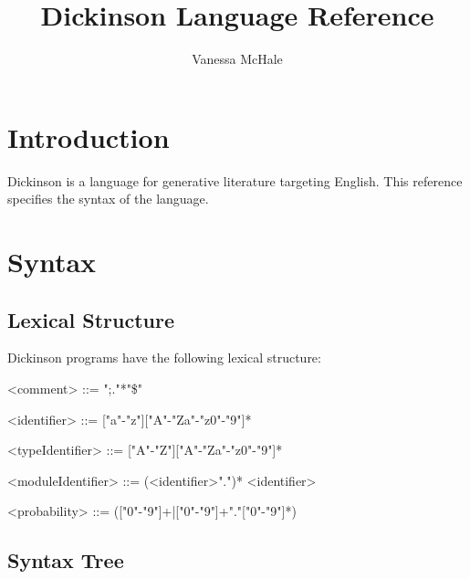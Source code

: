 \documentclass{report}
\begin{document}
\title{Dickinson Language Reference}
\author {Vanessa McHale}
\maketitle

\tableofcontents

\section{Introduction}

Dickinson is a language for generative literature targeting English. This reference specifies the syntax of the language.

\section{Syntax}

\subsection{Lexical Structure}

Dickinson programs have the following lexical structure:

\begin{grammar}

    <comment> ::= ";."*"\$"

    <identifier> ::= ["a"-"z"]["A"-"Za"-"z0"-"9"]*

    <typeIdentifier> ::= ["A"-"Z"]["A"-"Za"-"z0"-"9"]*

    <moduleIdentifier> ::= (<identifier>".")* <identifier>

    <probability> ::= (["0"-"9"]+|["0"-"9"]+"."["0"-"9"]*)

\end{grammar}

\subsection{Syntax Tree}

\setlength{\grammarparsep}{20pt plus 1pt minus 1pt}
\setlength{\grammarindent}{12em}

\end{document}
